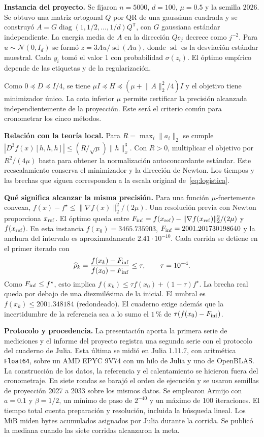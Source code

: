\documentclass[11pt,a4paper]{article}
\newcommand{\T}{^{\mathsf T}}
\newcommand{\nrm}[1]{\lVert #1\rVert}
\DeclareMathOperator{\diag}{diag}
\newcommand{\tema}[1]{\smallskip\par\textbf{#1}\enspace\ignorespaces}
\begin{document}
\tema{Instancia del proyecto.}
Se fijaron $n=5000$, $d=100$, $\mu=0.5$ y la semilla $2026$. Se obtuvo una matriz ortogonal $Q$ por QR de una gaussiana cuadrada y se construyó $A=G\diag(1,1/2,\ldots,1/d)Q\T$, con $G$ gaussiana estándar independiente. La energía media de $A$ en la dirección $Qe_j$ decrece como $j^{-2}$. Para $u\sim\mathcal N(0,I_d)$ se formó $z=3Au/\operatorname{sd}(Au)$, donde $\operatorname{sd}$ es la desviación estándar muestral. Cada $y_i$ tomó el valor $1$ con probabilidad $\sigma(z_i)$. El óptimo empírico depende de las etiquetas y de la regularización.

Como $0\preceq D\preceq I/4$, se tiene $\mu I\preceq H\preceq(\mu+\nrm A_2^2/4)I$ y el objetivo tiene minimizador único. La cota inferior $\mu$ permite certificar la precisión alcanzada independientemente de la proyección. Este será el criterio común para cronometrar los cinco métodos.

\tema{Relación con la teoría local.}
Para $R=\max_i\nrm{a_i}_2$ se cumple $|D^3 f(x)[h,h,h]|\le (R/\sqrt\mu)\nrm h_x^3$. Con $R>0$, multiplicar el objetivo por $R^2/(4\mu)$ basta para obtener la normalización autoconcordante estándar. Este reescalamiento conserva el minimizador y la dirección de Newton. Los tiempos y las brechas que siguen corresponden a la escala original de~\eqref{eq:logistica}.

\tema{Qué significa alcanzar la misma precisión.}
Para una función $\mu$-fuertemente convexa, $f(x)-f^\star\le\nrm{\nabla f(x)}_2^2/(2\mu)$. Una resolución previa con Newton proporciona $x_{\rm ref}$. El óptimo queda entre $F_{\rm inf}=f(x_{\rm ref})-\nrm{\nabla f(x_{\rm ref})}_2^2/(2\mu)$ y $f(x_{\rm ref})$. En esta instancia $f(x_0)=3465.735903$, $F_{\rm inf}=2001.201730198640$ y la anchura del intervalo es aproximadamente $2.41\cdot10^{-10}$. Cada corrida se detiene en el primer iterado con
\begin{equation}
 \widehat\rho_k=\frac{f(x_k)-F_{\rm inf}}{f(x_0)-F_{\rm inf}}\le\tau,\qquad \tau=10^{-4}.\label{eq:target}
\end{equation}
Como $F_{\rm inf}\le f^\star$, esto implica $f(x_k)\le\tau f(x_0)+(1-\tau)f^\star$. La brecha real queda por debajo de una diezmilésima de la inicial. El umbral es $f(x_k)\le2001.348184$ (redondeado). El cuaderno exige además que la incertidumbre de la referencia sea a lo sumo el $1\,\%$ de $\tau(f(x_0)-F_{\rm inf})$.

\tema{Protocolo y procedencia.}
La presentación aporta la primera serie de mediciones y el informe del proyecto registra una segunda serie con el protocolo del cuaderno de Julia. Esta última se midió en Julia 1.11.7, con aritmética \texttt{Float64}, sobre un AMD EPYC 9V74 con un hilo de Julia y uno de OpenBLAS. La construcción de los datos, la referencia y el calentamiento se hicieron fuera del cronometraje. En siete rondas se barajó el orden de ejecución y se usaron semillas de proyección 2027 a 2033 sobre los mismos datos. Se emplearon Armijo con $a=0.1$ y $\beta=1/2$, un mínimo de paso de $2^{-40}$ y un máximo de 100 iteraciones. El tiempo total cuenta preparación y resolución, incluida la búsqueda lineal. Los MiB miden bytes acumulados asignados por Julia durante la corrida. Se publicó la mediana cuando las siete corridas alcanzaron la meta.
\end{document}
